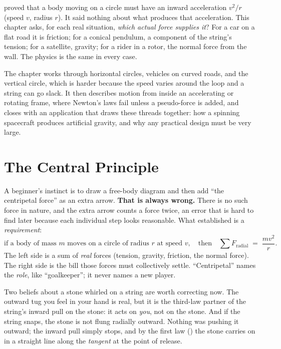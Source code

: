 
 proved that a body moving on a circle must have an inward acceleration $v^2/r$ (speed $v$, radius $r$). It said nothing
about what produces that acceleration. This chapter asks, for each real situation, \emph{which actual
force supplies it}? For a car on a flat road it is friction; for a conical pendulum, a component of the
string's tension; for a satellite, gravity; for a rider in a rotor, the normal force from the wall. The
physics is the same in every case.

The chapter works through horizontal circles, vehicles on curved roads, and the vertical circle, which is
harder because the speed varies around the loop and a string can go slack. It then describes motion from
inside an accelerating or rotating frame, where Newton's laws fail unless a pseudo-force is added, and
closes with an application that draws these threads together: how a spinning spacecraft produces
artificial gravity, and why any practical design must be very large.

\section{The Central Principle}\label{sec:centralprinciple}

A beginner's instinct is to draw a free-body diagram and then add ``the centripetal force'' as an extra
arrow. \textbf{That is always wrong.} There is no such force in nature, and the extra arrow counts a
force twice, an error that is hard to find later because each individual step looks reasonable. What
 established is a \emph{requirement}:
\[
\text{if a body of mass } m \text{ moves on a circle of radius } r \text{ at speed } v,
\quad\text{then}\quad
\sum F_{\text{radial}} \;=\; \frac{mv^{2}}{r}.
\]
The left side is a sum of \emph{real} forces (tension, gravity, friction, the normal force). The right
side is the bill those forces must collectively settle. ``Centripetal'' names the \emph{role}, like
``goalkeeper''; it never names a new player.

Two beliefs about a stone whirled on a string are worth correcting now. The outward tug you feel in your
hand is real, but it is the third-law partner of the string's inward pull on the stone: it acts on
\emph{you}, not on the stone. And if the string snaps, the stone is not flung radially outward. Nothing
was pushing it outward; the inward pull simply stops, and by the first law () the stone
carries on in a straight line along the \emph{tangent} at the point of release.

